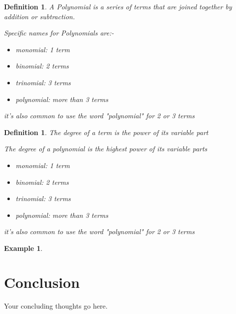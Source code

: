 \documentclass[12pt]{article}
\newtheorem{definition}[theorem]{Definition}
\newtheorem{example}[theorem]{Example}
\begin{document}
\begin{definition}
	A Polynomial is a series of terms that are joined together by addition or subtraction.

	Specific names for Polynomials are:-

	\begin{itemize}
		\item monomial: 1 term
		\item binomial: 2 terms
		\item trinomial: 3 terms
		\item polynomial: more than 3 terms
	\end{itemize}

	it's also common to use the word "polynomial" for 2 or 3 terms

\end{definition}

\begin{definition}
	The degree of a term is the power of its variable part

	The degree of a polynomial is the highest power of its variable parts
	\begin{itemize}
		\item monomial: 1 term
		\item binomial: 2 terms
		\item trinomial: 3 terms
		\item polynomial: more than 3 terms
	\end{itemize}

	it's also common to use the word "polynomial" for 2 or 3 terms

\end{definition}

\begin{example}

\end{example}

\section{Conclusion}

Your concluding thoughts go here.
\end{document}
